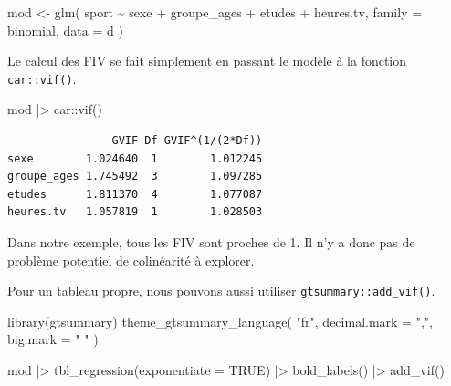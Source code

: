 \documentclass[
  letterpaper,
  DIV=11,
  numbers=noendperiod,
  oneside]{scrreprt}
\newenvironment{Shaded}{\begin{snugshade}}{\end{snugshade}}
\newcommand{\AttributeTok}[1]{\textcolor[rgb]{0.40,0.45,0.13}{#1}}
\newcommand{\ConstantTok}[1]{\textcolor[rgb]{0.56,0.35,0.01}{#1}}
\newcommand{\FunctionTok}[1]{\textcolor[rgb]{0.28,0.35,0.67}{#1}}
\newcommand{\NormalTok}[1]{\textcolor[rgb]{0.00,0.23,0.31}{#1}}
\newcommand{\OtherTok}[1]{\textcolor[rgb]{0.00,0.23,0.31}{#1}}
\newcommand{\SpecialCharTok}[1]{\textcolor[rgb]{0.37,0.37,0.37}{#1}}
\newcommand{\StringTok}[1]{\textcolor[rgb]{0.13,0.47,0.30}{#1}}
\begin{document}
\begin{Shaded}
\begin{Highlighting}[]
\NormalTok{mod }\OtherTok{\textless{}{-}} \FunctionTok{glm}\NormalTok{(}
\NormalTok{  sport }\SpecialCharTok{\textasciitilde{}}\NormalTok{ sexe }\SpecialCharTok{+}\NormalTok{ groupe\_ages }\SpecialCharTok{+}\NormalTok{ etudes }\SpecialCharTok{+}\NormalTok{ heures.tv,}
  \AttributeTok{family =}\NormalTok{ binomial,}
  \AttributeTok{data =}\NormalTok{ d}
\NormalTok{)}
\end{Highlighting}
\end{Shaded}

Le calcul des FIV se fait simplement en passant le modèle à la fonction
\texttt{car::vif()}.

\begin{Shaded}
\begin{Highlighting}[]
\NormalTok{mod }\SpecialCharTok{|\textgreater{}}\NormalTok{ car}\SpecialCharTok{::}\FunctionTok{vif}\NormalTok{()}
\end{Highlighting}
\end{Shaded}

\begin{verbatim}
                GVIF Df GVIF^(1/(2*Df))
sexe        1.024640  1        1.012245
groupe_ages 1.745492  3        1.097285
etudes      1.811370  4        1.077087
heures.tv   1.057819  1        1.028503
\end{verbatim}

Dans notre exemple, tous les FIV sont proches de 1. Il n'y a donc pas de
problème potentiel de colinéarité à explorer.

Pour un tableau propre, nous pouvons aussi utiliser
\texttt{gtsummary::add\_vif()}.

\begin{Shaded}
\begin{Highlighting}[]
\FunctionTok{library}\NormalTok{(gtsummary)}
\FunctionTok{theme\_gtsummary\_language}\NormalTok{(}
  \StringTok{"fr"}\NormalTok{,}
  \AttributeTok{decimal.mark =} \StringTok{","}\NormalTok{,}
  \AttributeTok{big.mark =} \StringTok{" "}
\NormalTok{)}
\end{Highlighting}
\end{Shaded}

\begin{Shaded}
\begin{Highlighting}[]
\NormalTok{mod }\SpecialCharTok{|\textgreater{}} 
  \FunctionTok{tbl\_regression}\NormalTok{(}\AttributeTok{exponentiate =} \ConstantTok{TRUE}\NormalTok{) }\SpecialCharTok{|\textgreater{}} 
  \FunctionTok{bold\_labels}\NormalTok{() }\SpecialCharTok{|\textgreater{}} 
  \FunctionTok{add\_vif}\NormalTok{()}
\end{Highlighting}
\end{Shaded}
\end{document}
